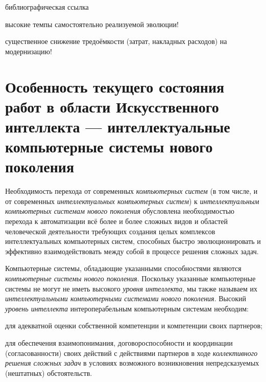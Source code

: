 \begin{partbacktext}
\begin{SCn}
	\bigskip
	
	\begin{scnrelfromlist}{библиографическая ссылка}
		\scnitem{}
		\scnitem{}
		\scnitem{}
	\end{scnrelfromlist}
	
\end{SCn}
	
\begin{SCn}
\end{SCn}

\begin{SCn}
	\begin{scnitemize}
		\item высокие темпы самостоятельно реализуемой эволюции!
		\item существенное снижение тредоёмкости (затрат, накладных расходов) на модернизацию!
	\end{scnitemize}
\end{SCn}
	
\end{partbacktext}


\section*{Особенность текущего состояния работ в области Искусственного интеллекта --- интеллектуальные компьютерные системы нового поколения}
\label{concl_feature_current_state_work_field_AI}

Необходимость перехода от современных \textit{компьютерных систем} (в том числе, и от современных \textit{интеллектуальных компьютерных систем}) к \textit{интеллектуальным компьютерных системам нового поколения} обусловлена необходимостью перехода к автоматизации всё более и более сложных видов и областей человеческой деятельности требующих создания целых комплексов интеллектуальных компьютерных систем, способных быстро эволюционировать и эффективно взаимодействовать между собой в процессе  решения сложных задач.

Компьютерные системы, обладающие указанными способностями являются \textit{компьютерные системы нового поколения}. Поскольку указанные компьютерные системы не могут не иметь высокого \textit{уровня интеллекта}, мы также называем их \textit{интеллектуальными компьютерными системами нового поколения}. Высокий \textit{уровень интеллекта} интероперабельным компьютерным системам необходим:
\begin{textitemize}
	\item для адекватной оценки собственной компетенции и компетенции своих партнеров;
	\item для обеспечения взаимопонимания, договороспособности и координации (согласованности) своих действий с действиями партнеров в ходе \textit{коллективного решения сложных задач} в условиях возможного возникновения непредсказуемых (нештатных) обстоятельств.
\end{textitemize}

